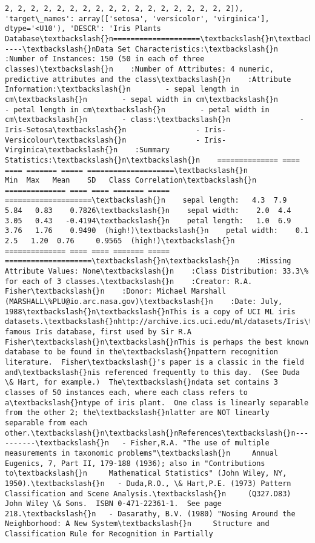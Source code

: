 \documentclass[11pt]{article}
\begin{document}
\begin{Verbatim}[commandchars=\\\{\}]
       2, 2, 2, 2, 2, 2, 2, 2, 2, 2, 2, 2, 2, 2, 2, 2, 2, 2]), 'target\_names': array(['setosa', 'versicolor', 'virginica'], dtype='<U10'), 'DESCR': 'Iris Plants Database\textbackslash{}n====================\textbackslash{}n\textbackslash{}nNotes\textbackslash{}n-----\textbackslash{}nData Set Characteristics:\textbackslash{}n    :Number of Instances: 150 (50 in each of three classes)\textbackslash{}n    :Number of Attributes: 4 numeric, predictive attributes and the class\textbackslash{}n    :Attribute Information:\textbackslash{}n        - sepal length in cm\textbackslash{}n        - sepal width in cm\textbackslash{}n        - petal length in cm\textbackslash{}n        - petal width in cm\textbackslash{}n        - class:\textbackslash{}n                - Iris-Setosa\textbackslash{}n                - Iris-Versicolour\textbackslash{}n                - Iris-Virginica\textbackslash{}n    :Summary Statistics:\textbackslash{}n\textbackslash{}n    ============== ==== ==== ======= ===== ====================\textbackslash{}n                    Min  Max   Mean    SD   Class Correlation\textbackslash{}n    ============== ==== ==== ======= ===== ====================\textbackslash{}n    sepal length:   4.3  7.9   5.84   0.83    0.7826\textbackslash{}n    sepal width:    2.0  4.4   3.05   0.43   -0.4194\textbackslash{}n    petal length:   1.0  6.9   3.76   1.76    0.9490  (high!)\textbackslash{}n    petal width:    0.1  2.5   1.20  0.76     0.9565  (high!)\textbackslash{}n    ============== ==== ==== ======= ===== ====================\textbackslash{}n\textbackslash{}n    :Missing Attribute Values: None\textbackslash{}n    :Class Distribution: 33.3\% for each of 3 classes.\textbackslash{}n    :Creator: R.A. Fisher\textbackslash{}n    :Donor: Michael Marshall (MARSHALL\%PLU@io.arc.nasa.gov)\textbackslash{}n    :Date: July, 1988\textbackslash{}n\textbackslash{}nThis is a copy of UCI ML iris datasets.\textbackslash{}nhttp://archive.ics.uci.edu/ml/datasets/Iris\textbackslash{}n\textbackslash{}nThe famous Iris database, first used by Sir R.A Fisher\textbackslash{}n\textbackslash{}nThis is perhaps the best known database to be found in the\textbackslash{}npattern recognition literature.  Fisher\textbackslash{}'s paper is a classic in the field and\textbackslash{}nis referenced frequently to this day.  (See Duda \& Hart, for example.)  The\textbackslash{}ndata set contains 3 classes of 50 instances each, where each class refers to a\textbackslash{}ntype of iris plant.  One class is linearly separable from the other 2; the\textbackslash{}nlatter are NOT linearly separable from each other.\textbackslash{}n\textbackslash{}nReferences\textbackslash{}n----------\textbackslash{}n   - Fisher,R.A. "The use of multiple measurements in taxonomic problems"\textbackslash{}n     Annual Eugenics, 7, Part II, 179-188 (1936); also in "Contributions to\textbackslash{}n     Mathematical Statistics" (John Wiley, NY, 1950).\textbackslash{}n   - Duda,R.O., \& Hart,P.E. (1973) Pattern Classification and Scene Analysis.\textbackslash{}n     (Q327.D83) John Wiley \& Sons.  ISBN 0-471-22361-1.  See page 218.\textbackslash{}n   - Dasarathy, B.V. (1980) "Nosing Around the Neighborhood: A New System\textbackslash{}n     Structure and Classification Rule for Recognition in Partially 
\end{Verbatim}
\end{document}
